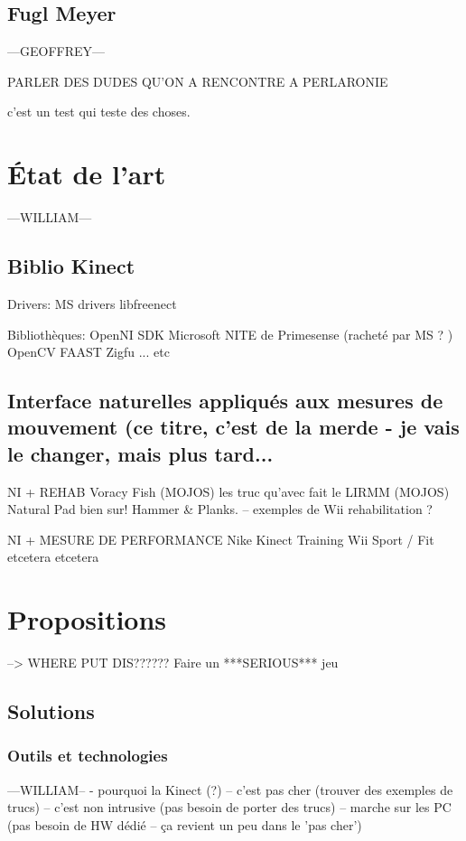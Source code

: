 \documentclass[french,12pt]{report}
\begin{document}
		
		\section{Fugl Meyer} 		---GEOFFREY---
		
		PARLER DES DUDES QU'ON A RENCONTRE A PERLARONIE
		
		
		c'est un test qui teste des choses.
		
	\chapter{État de l'art} 		---WILLIAM---
	

	
		\section{Biblio Kinect}
		
		Drivers:
		MS drivers
		libfreenect
		
		Bibliothèques:
		OpenNI
		SDK Microsoft
		NITE de Primesense (racheté par MS ? )
		OpenCV
		FAAST
		Zigfu
		... etc
		
		
		\section{Interface naturelles appliqués aux mesures de mouvement 
		(ce titre, c'est de la merde - je vais le changer, mais plus tard...}

		NI + REHAB
		Voracy Fish (MOJOS)
		les truc qu'avec fait le LIRMM (MOJOS)
 		Natural Pad bien sur! Hammer \& Planks.
		-- exemples de Wii rehabilitation ?
		
		NI + MESURE DE PERFORMANCE
		Nike Kinect Training
		Wii Sport / Fit
		etcetera etcetera
		
		
	\chapter{Propositions}
	
	
	
		--> WHERE PUT DIS?????? Faire un ***SERIOUS*** jeu
		
		
		
		\section{Solutions}
		
		\subsection{Outils et technologies} 		---WILLIAM--
		- pourquoi la Kinect (?)
		-- c'est pas cher (trouver des exemples de trucs)
		-- c'est non intrusive (pas besoin de porter des trucs)
		-- marche sur les PC (pas besoin de HW dédié -- ça revient un peu dans le 'pas cher')
		
\end{document}
